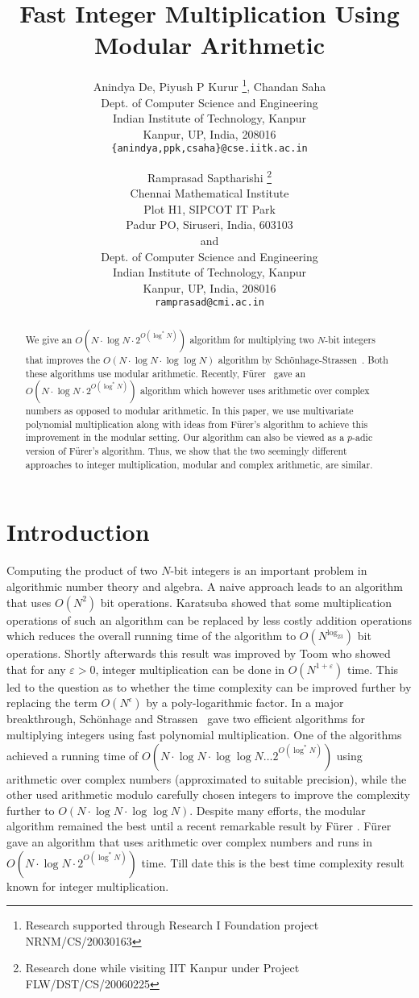 \documentclass[11pt]{article}
\title{Fast Integer Multiplication Using Modular Arithmetic}
\author{Anindya De, Piyush P Kurur%
  \thanks{Research supported through Research I Foundation project
    NRNM/CS/20030163}, %
  Chandan Saha\\%
  Dept. of Computer Science and Engineering\\%
  Indian Institute of Technology, Kanpur\\%
  Kanpur, UP, India, 208016\\%
  {\tt \{anindya,ppk,csaha\}@cse.iitk.ac.in}%
  \and  Ramprasad Saptharishi%
  \thanks{Research done while visiting IIT Kanpur %
    under Project FLW/DST/CS/20060225}\\%
  Chennai Mathematical Institute\\%
  Plot H1, SIPCOT IT Park\\%
  Padur PO, Siruseri, India, 603103\\%
  and\\%
  Dept. of Computer Science and Engineering\\%
  Indian Institute of Technology, Kanpur\\%
  Kanpur, UP, India, 208016\\%
  {\tt ramprasad@cmi.ac.in}
}
\begin{document}
\maketitle
\begin{abstract}
We give an $O(N\cdot \log N\cdot 2^{O(\log^*N)})$ algorithm for
multiplying two $N$-bit integers that improves the $O(N\cdot \log
N\cdot \log\log N)$ algorithm by
Sch\"{o}nhage-Strassen~\cite{scho}. Both these algorithms use modular
arithmetic. Recently, F\"{u}rer~\cite{Furer} gave an $O(N\cdot \log
N\cdot 2^{O(\log^*N)})$ algorithm which however uses arithmetic over
complex numbers as opposed to modular arithmetic. In this paper, we
use multivariate polynomial multiplication along with ideas {}from
F\"{u}rer's algorithm to achieve this improvement in the modular
setting.  Our algorithm can also be viewed as a $p$-adic version of
F\"{u}rer's algorithm. Thus, we show that the two seemingly different
approaches to integer multiplication, modular and complex arithmetic,
are similar.
\end{abstract}


\section{Introduction}

Computing the product of two $N$-bit integers is an important problem
in algorithmic number theory and algebra. A naive approach leads to an
algorithm that uses $O(N^2)$ bit operations. Karatsuba \cite{Karatsuba} showed that some multiplication operations of
such an algorithm can be replaced by less costly addition operations
which reduces the overall running time of the algorithm to
$O(N^{\log_23})$ bit operations. Shortly afterwards this result was
improved by Toom \cite{Toom} who showed that for any $\varepsilon>0$,
integer multiplication can be done in $O(N^{1+\varepsilon})$
time. This led to the question as to whether the time complexity can
be improved further by replacing the term $O(N^{\epsilon})$ by a
poly-logarithmic factor. In a major breakthrough, Sch\"{o}nhage and
Strassen~\cite{scho} gave two efficient algorithms for multiplying
integers using fast polynomial multiplication. One of the algorithms
achieved a running time of $O(N\cdot \log N\cdot \log\log N\ldots
2^{O(\log^*N)})$ using arithmetic over complex numbers (approximated
to suitable precision), while the other used arithmetic modulo
carefully chosen integers to improve the complexity further to
$O(N\cdot \log N\cdot \log\log N)$. Despite many efforts, the modular
algorithm remained the best until a recent remarkable result by
F\"{u}rer \cite{Furer}. F\"{u}rer gave an algorithm that uses
arithmetic over complex numbers and runs in $O(N\cdot\log N\cdot
2^{O(\log^\ast N)})$ time. Till date this is the best time complexity
result known for integer multiplication.
\end{document}
